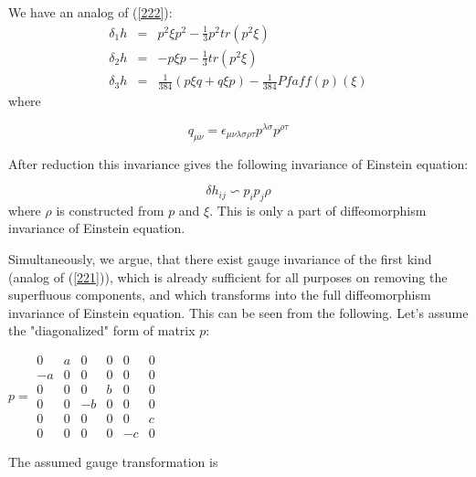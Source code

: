 \documentclass[a4paper,12pt]{article}
\begin{document}
We have an analog of (\ref{222}):
\begin{eqnarray}
\delta _{1}h &=&p^{2}\xi p^{2}-\frac{1}{3}p^{2}tr(p^{2}\xi ) \label{var62}\\
\delta _{2}h &=&-p\xi p -\frac {1}{3}tr(p^2\xi)\\
\delta _{3}h &=&\frac{1}{384}(p\xi q+q\xi
p)-\frac{1}{384}Pfaff(p)(\xi)
\end{eqnarray}
where

\begin{equation}
q_{\mu \nu }=\epsilon _{\mu \nu \lambda \sigma \rho \tau }p^{\lambda \sigma
}p^{\rho \tau }
\end{equation}

After reduction this invariance gives the following invariance of
Einstein equation:

\begin{equation}
\delta h_{ij}\backsim p_{i}p_{j}\rho
\end{equation}
where $\rho $ is constructed from $p$ and $\xi$. This is only a
part of diffeomorphism invariance of Einstein equation.

Simultaneously, we argue, that there exist gauge invariance of the
first kind (analog of (\ref{221})), which is already sufficient
for all purposes on removing the superfluous components, and which
transforms into the full diffeomorphism invariance of Einstein
equation. This can be seen from the following. Let's assume the
"diagonalized" form of matrix $p$:

$p=
\begin{array}{cccccc}
0 & a & 0 & 0 & 0 & 0 \\
-a & 0 & 0 & 0 & 0 & 0 \\
0 & 0 & 0 & b & 0 & 0 \\
0 & 0 & -b & 0 & 0 & 0 \\
0 & 0 & 0 & 0 & 0 & c \\
0 & 0 & 0 & 0 & -c & 0
\end{array}
\allowbreak $

The assumed gauge transformation is
\end{document}

